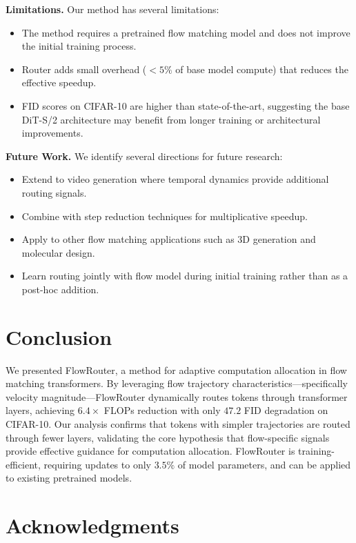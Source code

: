 \documentclass{article}
\begin{document}
\textbf{Limitations.} Our method has several limitations:
\begin{itemize}
    \item The method requires a pretrained flow matching model and does not improve the initial training process.
    \item Router adds small overhead ($<5\%$ of base model compute) that reduces the effective speedup.
    \item FID scores on CIFAR-10 are higher than state-of-the-art, suggesting the base DiT-S/2 architecture may benefit from longer training or architectural improvements.
\end{itemize}

\textbf{Future Work.} We identify several directions for future research:
\begin{itemize}
    \item Extend to video generation where temporal dynamics provide additional routing signals.
    \item Combine with step reduction techniques for multiplicative speedup.
    \item Apply to other flow matching applications such as 3D generation and molecular design.
    \item Learn routing jointly with flow model during initial training rather than as a post-hoc addition.
\end{itemize}

\section{Conclusion}
\label{sec:conclusion}

We presented FlowRouter, a method for adaptive computation allocation in flow matching transformers. By leveraging flow trajectory characteristics---specifically velocity magnitude---FlowRouter dynamically routes tokens through transformer layers, achieving $6.4\times$ FLOPs reduction with only $47.2$ FID degradation on CIFAR-10. Our analysis confirms that tokens with simpler trajectories are routed through fewer layers, validating the core hypothesis that flow-specific signals provide effective guidance for computation allocation. FlowRouter is training-efficient, requiring updates to only $3.5\%$ of model parameters, and can be applied to existing pretrained models.

\section*{Acknowledgments}
\end{document}
